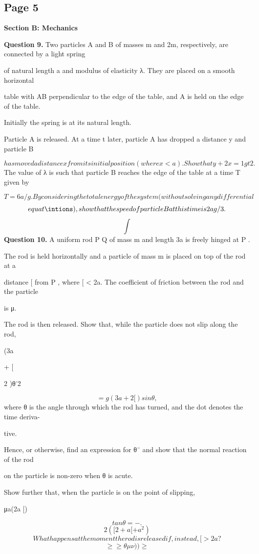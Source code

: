 \documentclass[12pt]{article}
\begin{document}
\subsection*{Page 5}
\begin{flushleft}
\bigskip\textbf{Section B: Mechanics}\par
\bigskip\textbf{Question 9.} Two particles A and B of masses m and 2m, respectively, are connected by a light spring\par
of natural length a and modulus of elasticity λ. They are placed on a smooth horizontal\par
table with AB perpendicular to the edge of the table, and A is held on the edge of the table.\par
Initially the spring is at its natural length.\par
Particle A is released. At a time t later, particle A has dropped a distance y and particle B\par
\[has moved a distance x from its initial position (where x < a). Show that y + 2x = 1 gt2.\]
The value of λ is such that particle B reaches the edge of the table at a time T given by\par
\[T = 6a/g . By considering the total energy of the system (without solving any differential\]
\[equat\intions), show that the speed of particle B at this time is 2ag/3 .\]
\[\int\]
\bigskip\textbf{Question 10.} A uniform rod P Q of mass m and length 3a is freely hinged at P .\par
The rod is held horizontally and a particle of mass m is placed on top of the rod at a\par
distance [ from P , where [ < 2a. The coefficient of friction between the rod and the particle\par
is μ.\par
The rod is then released. Show that, while the particle does not slip along the rod,\par
(3a\par
+ [\par
2 )θ˙2\par
\[= g(3a + 2[) sin θ ,\]
where θ is the angle through which the rod has turned, and the dot denotes the time deriva-\par
tive.\par
Hence, or otherwise, find an expression for θ¨ and show that the normal reaction of the rod\par
on the particle is non-zero when θ is acute.\par
Show further that, when the particle is on the point of slipping,\par
μa(2a [)\par
\[tan θ = - .\]
\[2([2 + a[ + a^2)\]
\[What happens at the moment the rod is released if, instead, [ > 2a?\]
\[\geq\geq\theta\mu\nu) ) \geq\]
\end{flushleft}
\end{document}
